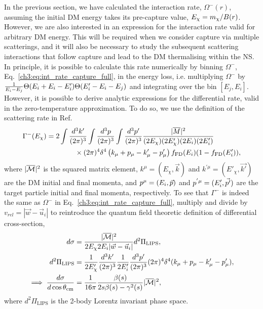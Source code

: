 In the previous section, we have calculated the interaction rate, $\Omega^-(r)$, assuming the initial DM energy takes its pre-capture value, $E_\chi = m_\chi /B(r)$. However, we are also interested in an expression for the interaction rate valid for arbitrary DM energy. This will be required when we consider capture via multiple scatterings, and it will also be necessary to study the subsequent scattering interactions that follow capture and lead to the DM thermalising within the NS.
In principle, it is possible to calculate this rate numerically by binning $\Omega^-$, Eq.~\ref{ch3:eq:int_rate_capture_full}, in the energy loss, i.e. multiplying $\Omega^-$ by $\frac{1}{E_i-E_j}\Theta(E_i+E_i-E_i')\Theta(E_i'-E_i-E_j)$ and integrating over the bin $[E_j,E_i]$. 
However, it is possible to derive analytic expressions for the differential rate, valid in the zero-temperature approximation. To do so, we use the definition of the scattering rate in Ref.~\cite{Reddy:1997yr_Neutrinointeractionshot,Bertoni:2013bsa_dec_DarkMatterThermalization} 
\begin{equation}
    \begin{split}
        \Gamma^-(E_\chi) &= 2\int \frac{d^3k'}{(2\pi)^3}\int \frac{d^3p}{(2\pi)^3}\int \frac{d^3p'}{(2\pi)^3} \frac{|\overline{M}|^2}{(2E_\chi)(2E'_\chi)(2E_i)(2E_i')}\\
        &\hspace{4em}\times(2\pi)^4\delta^4\left(k_\mu+p_\mu-k_\mu'-p_\mu'\right) f_{\rm FD}(E_i)(1-f_{\rm FD}(E_i')),
    \end{split}
\label{ch3:eq:scattrate}
\end{equation}
where $|\overline{\mathcal M}|^2$ is the squared matrix element,
$k^\mu=(E_\chi,\vec{k})$ and $k^{'\mu}=(E'_\chi,\vec{k'})$ are the DM initial and final momenta, and $p^\mu=(E_i,\vec{p})$ and $p^{'\mu}=(E_i',\vec{p'})$ are the target particle initial and final momenta, respectively.
To see that $\Gamma^-$ is indeed the same as $\Omega^-$ in Eq.~\ref{ch3:eq:int_rate_capture_full}, multiply and divide by
$v_{rel}=|\vec{w}-\vec{u}_i|$ to reintroduce the quantum field theoretic definition of differential cross-section, 
\begin{align}
    d\sigma & = \frac{|\overline{\mathcal M}|^2}{2 E_\chi 2E_i|\vec{w} - \vec{u}_i|}d^2\Pi_\mathrm{LIPS},\\
    d^2\Pi_\mathrm{LIPS} &= \frac{1}{2E'_\chi}\frac{d^3 k'}{(2\pi)^3}\frac{1}{ 2E_i'}\frac{d^3 p'}{(2\pi)^3}(2\pi)^4\delta^4(k_\mu + p_\mu - k'_\mu - p'_\mu),\\
    \implies\frac{d\sigma}{d\cos\theta_\mathrm{cm}} &= \frac{1}{16 \pi}\frac{\beta(s)}{2 s \beta(s) - \gamma^2(s)}|\overline{\mathcal M}|^2,
\end{align}
where $d^2\Pi_\mathrm{LIPS}$ is the 2-body Lorentz invariant phase space.

